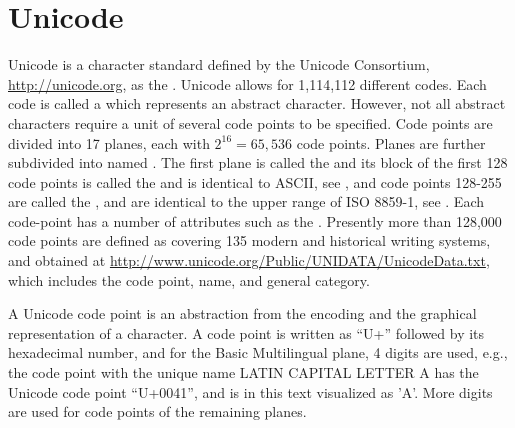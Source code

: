 \documentclass[fsharpnotes.tex]{subfiles}
\begin{document}
\section{Unicode}
\label{sec:unicode}
Unicode is a character standard defined by the Unicode Consortium, \url{http://unicode.org}, as the . Unicode allows for 1,114,112 different codes. Each code is called a  which represents an abstract character. However, not all abstract characters require a unit of several code points to be specified. Code points are divided into 17 planes, each with $2^{16}=65,536$ code points. Planes are further subdivided into named . The first plane is called the  and its block of the first 128 code points is called the  and is identical to ASCII, see , and code points 128-255 are called the , and are identical to the upper range of ISO 8859-1, see .  Each code-point has a number of attributes such as the . Presently more than 128,000 code points are defined as covering 135 modern and historical writing systems, and obtained at \url{http://www.unicode.org/Public/UNIDATA/UnicodeData.txt}, which includes the code point, name, and general category.

A Unicode code point is an abstraction from the encoding and the graphical representation of a character. A code point is written as ``U+'' followed by its hexadecimal number, and for the Basic Multilingual plane, 4 digits are used, e.g., the code point with the unique name LATIN CAPITAL LETTER A has the Unicode code point ``U+0041'', and is in this text visualized as 'A'. More digits are used for code points of the remaining planes.
\end{document}
